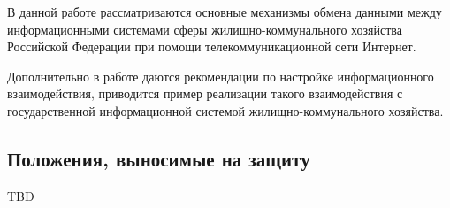 В данной работе рассматриваются основные механизмы обмена данными между информационными системами сферы жилищно-коммунального хозяйства Российской Федерации при помощи телекоммуникационной сети Интернет.

Дополнительно в работе даются рекомендации по настройке информационного взаимодействия, приводится пример реализации такого взаимодействия с государственной информационной системой жилищно-коммунального хозяйства.

\subsection*{Положения, выносимые на защиту}

TBD

\clearpage
\newpage